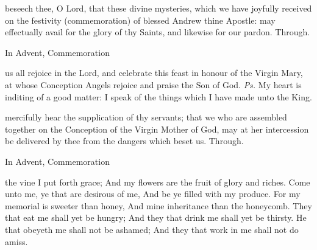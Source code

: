 \postcommunion
{} beseech thee, O Lord, that these divine mysteries, which we have joyfully received on the festivity (commemoration) of blessed Andrew thine Apostle: may effectually avail for the glory of thy Saints, and likewise for our pardon. Through.
\begin{rubric}
    In Advent, Commemoration 
\end{rubric}


\clearpage
{}

\introit
{} us all rejoice in the Lord, and celebrate this feast in honour of the Virgin Mary, at whose Conception Angels rejoice and praise the Son of God. \textit{Ps.} My heart is inditing of a good matter: I speak of the things which I have made unto the King.

\collect
{} mercifully hear the supplication of thy servants; that we who are assembled together on the Conception of the Virgin Mother of God, may at her intercession be delivered by thee from the dangers which beset us. Through.
\begin{rubric}
    In Advent, Commemoration 
\end{rubric}

 the vine I put forth grace; And my flowers are the fruit of glory and riches. Come unto me, ye that are desirous of me, And be ye filled with my produce. For my memorial is sweeter than honey, And mine inheritance than the honeycomb. They that eat me shall yet be hungry; And they that drink me shall yet be thirsty. He that obeyeth me shall not be ashamed; And they that work in me shall not do amiss. 

